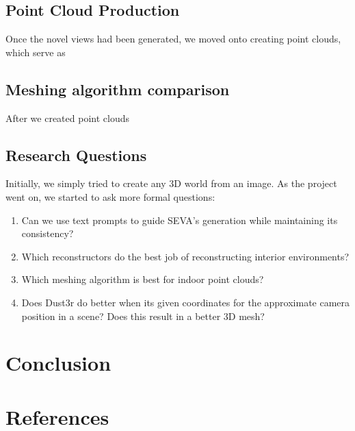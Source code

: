 \documentclass{article}
\begin{document}
\subsection{Point Cloud Production}

Once the novel views had been generated, we moved onto creating point clouds, which serve as

\subsection{Meshing algorithm comparison}

After we created point clouds

\subsection{Research Questions}

Initially, we simply tried to create any 3D world from an image. As the project went on, we started to ask  more formal questions:

\begin{enumerate}
  \item Can we use text prompts to guide SEVA's generation while maintaining its consistency?
  \item  Which reconstructors do the best job of reconstructing interior environments?
  \item Which meshing algorithm is best for indoor point clouds?
  \item Does Dust3r do better when its given coordinates for the approximate camera position in a scene? Does this result in a better 3D mesh?
\end{enumerate}



\section{Conclusion}




\section*{References}

\small




\end{document}

